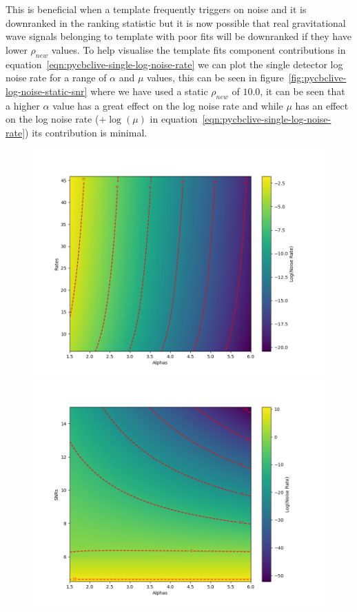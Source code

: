 This is beneficial when a template frequently triggers on noise and it is downranked in the ranking statistic but it is now possible that real gravitational wave signals belonging to template with poor fits will be downranked if they have lower $\rho_{new}$ values. To help visualise the template fits component contributions in equation~\ref{eqn:pycbclive-single-log-noise-rate} we can plot the single detector log noise rate for a range of $\alpha$ and $\mu$ values, this can be seen in figure~\ref{fig:pycbclive-log-noise-static-snr} where we have used a static $\rho_{new}$ of $10.0$, it can be seen that a higher $\alpha$ value has a great effect on the log noise rate and while $\mu$ has an effect on the log noise rate ($ + \log(\mu)$ in equation~\ref{eqn:pycbclive-single-log-noise-rate}) its contribution is minimal.
%
\begin{figure}
  \centering
  \begin{minipage}[t]{1.0\linewidth}
  
    \includegraphics[width=1\textwidth]{images/pycbclive/lognoise_alpha_rate.png}
    \caption{}
    \label{fig:pycbclive-log-noise-static-snr}
  
    \includegraphics[width=1\textwidth]{images/pycbclive/lognoise_alpha_snr.png}
    \caption{}
    \label{fig:pycbclive-log-noise-static-rate}


\end{minipage}
\end{figure}
